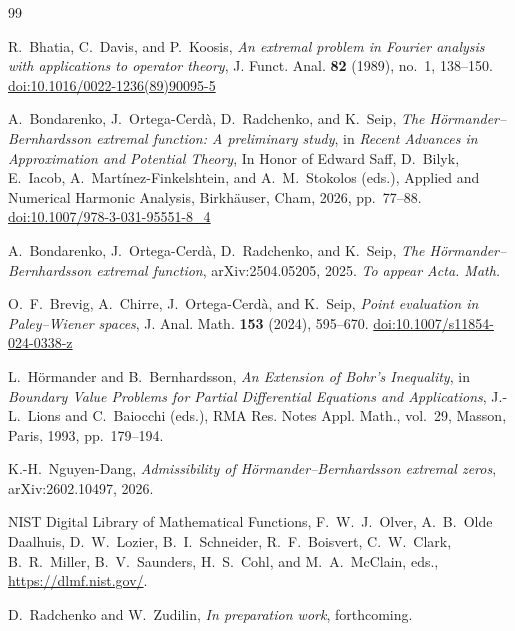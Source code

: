 \documentclass[11pt,letterpaper]{amsart}
\numberwithin{equation}{section}
\theoremstyle{plain}
\theoremstyle{remark}
\newcommand{\doi}[1]{\href{https://doi.org/#1}{doi:#1}}
\begin{document}
\begin{thebibliography}{99}

R.~Bhatia, C.~Davis, and P.~Koosis,
\emph{An extremal problem in Fourier analysis with applications to operator theory},
J. Funct. Anal. \textbf{82} (1989), no.~1, 138--150.
\doi{10.1016/0022-1236(89)90095-5}

A.~Bondarenko, J.~Ortega-Cerd\`a, D.~Radchenko, and K.~Seip,
\emph{The H\"ormander--Bernhardsson extremal function: A preliminary study},
in \emph{Recent Advances in Approximation and Potential Theory},
In Honor of Edward Saff,
D.~Bilyk, E.~Iacob, A.~Mart\'inez-Finkelshtein, and A.~M.~Stokolos (eds.),
Applied and Numerical Harmonic Analysis,
Birkh\"auser, Cham, 2026, pp.~77--88.
\doi{10.1007/978-3-031-95551-8\_4}

A.~Bondarenko, J.~Ortega-Cerd\`a, D.~Radchenko, and K.~Seip,
\emph{The H\"ormander--Bernhardsson extremal function},
arXiv:2504.05205, 2025. \emph{To appear Acta. Math.}
 

O.~F.~Brevig, A.~Chirre, J.~Ortega-Cerd\`a, and K.~Seip,
\emph{Point evaluation in Paley--Wiener spaces},
J. Anal. Math. \textbf{153} (2024), 595--670.
\doi{10.1007/s11854-024-0338-z}

L.~H\"ormander and B.~Bernhardsson,
\emph{An Extension of Bohr's Inequality},
in \emph{Boundary Value Problems for Partial Differential Equations and Applications},
J.-L.~Lions and C.~Baiocchi (eds.),
RMA Res. Notes Appl. Math., vol.~29,
Masson, Paris, 1993, pp.~179--194.

K.-H.~Nguyen-Dang,
\emph{Admissibility of H\"ormander--Bernhardsson extremal zeros},
arXiv:2602.10497, 2026.


NIST Digital Library of Mathematical Functions,
F.~W.~J.~Olver, A.~B.~Olde Daalhuis, D.~W.~Lozier, B.~I.~Schneider,
R.~F.~Boisvert, C.~W.~Clark, B.~R.~Miller, B.~V.~Saunders,
H.~S.~Cohl, and M.~A.~McClain, eds.,
\url{https://dlmf.nist.gov/}.

D.~Radchenko and W.~Zudilin,
\emph{In preparation work}, forthcoming.
\end{thebibliography}
\end{document}
